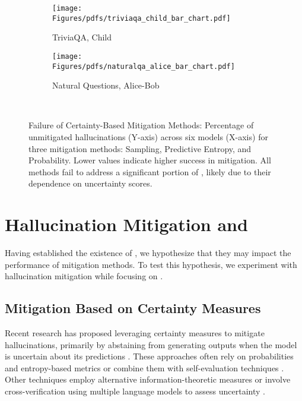 

\begin{figure*}

\centering

 \centering
\begin{subfigure}[b]{0.49\textwidth}
  \centering
  \texttt{[image: Figures/pdfs/triviaqa\_child\_bar\_chart.pdf]}
  \caption{TriviaQA, Child}
 \end{subfigure}%
 \hfill
 \begin{subfigure}[b]{0.49\textwidth}
  \centering
\texttt{[image: Figures/pdfs/naturalqa\_alice\_bar\_chart.pdf]}
\caption{Natural Questions, Alice-Bob}
\end{subfigure}\\

\caption{Failure of Certainty-Based Mitigation Methods: Percentage of unmitigated hallucinations (Y-axis) across six models (X-axis) for three mitigation methods: Sampling, Predictive Entropy, and Probability. Lower values indicate higher success in mitigation. 
All methods fail to address a significant portion of \chk, likely due to their dependence on uncertainty scores.}
\label{mitigation_fig}
\end{figure*}

\section{Hallucination Mitigation and \chk}\label{sec:mitigation_methods}

Having established the existence of \chk, we hypothesize that they may impact the performance of mitigation methods. 
To test this hypothesis, we experiment with hallucination mitigation while focusing on \chk.

\subsection{Mitigation Based on Certainty Measures}


Recent research has proposed leveraging certainty measures to mitigate hallucinations, primarily by abstaining from generating outputs when the model is uncertain about its predictions \cite{cole-etal-2023-selectively,tjandra2024fine}. 
These approaches often rely on probabilities and entropy-based metrics \cite{tjandra2024fine} or combine them with self-evaluation techniques \cite{tomani2024uncertainty}. Other techniques employ alternative information-theoretic measures \cite{yadkori2024believe, yadkori2024mitigating} or involve cross-verification using multiple language models to assess uncertainty \cite{feng2024don}.


